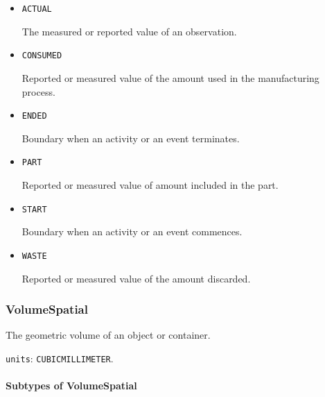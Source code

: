 \begin{itemize}

\item \texttt{ACTUAL}


The measured or reported value of an \gls{observation}.

\item \texttt{CONSUMED}


Reported or measured value of the amount used in the manufacturing process.

\item \texttt{ENDED}


Boundary when an activity or an event terminates.

\item \texttt{PART}


Reported or measured value of amount included in the \gls{part}.

\item \texttt{START}


Boundary when an activity or an event commences.

\item \texttt{WASTE}


Reported or measured value of the amount discarded.


\end{itemize}









\subsubsection{VolumeSpatial}
\label{sec:VolumeSpatial}



The geometric volume of an object or container.


\texttt{units}: \texttt{CUBIC\textunderscore MILLIMETER}.

\paragraph{Subtypes of VolumeSpatial}\mbox{}
\label{sec:Subtypes of VolumeSpatial}

